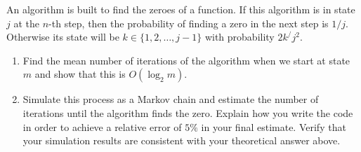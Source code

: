 \documentclass[12pt]{article}
\begin{document}


\begin{problem}
An algorithm is built to find the zeroes of a function. If this
algorithm is in state $j$ at the $n$-th step, then the probability of
finding a zero in the next step is $1/j$. Otherwise its state will be $k
\in \{1,2,\ldots, j-1\}$ with probability $2k^/j^2$. 
\begin{enumerate}
\item {} Find the mean number of iterations of the algorithm
    when we start at state $m$ and show that this is $O(\log_2 m)$. 
\item {} Simulate this process as a Markov chain and estimate
    the number of iterations until the algorithm finds the zero. Explain
    how you write the code  in order to achieve a  relative error of
    $5\%$ in your final estimate.  Verify that your simulation results
    are consistent with your theoretical answer above. 
\end{enumerate}
\end{problem}


\end{document}
